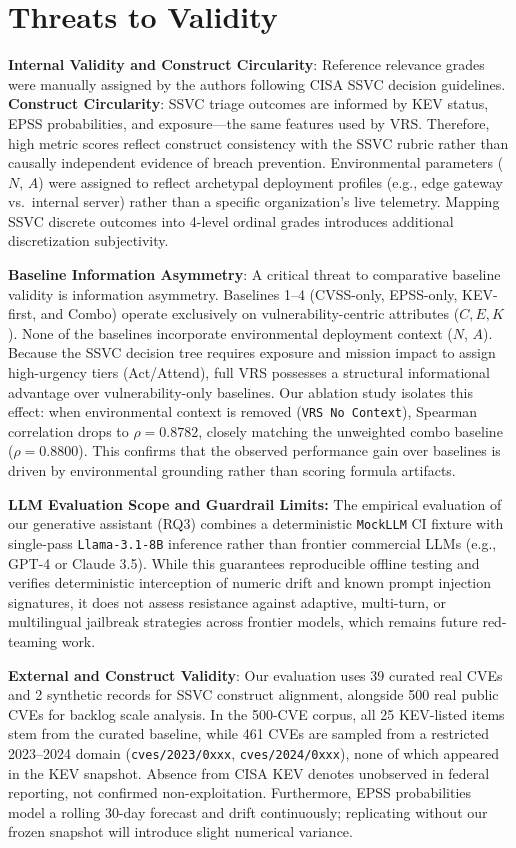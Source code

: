\documentclass[conference]{IEEEtran}
\begin{document}
\section{Threats to Validity}

\textbf{Internal Validity and Construct Circularity}:
Reference relevance grades were manually assigned by the authors following CISA SSVC decision guidelines. \textbf{Construct Circularity}: SSVC triage outcomes are informed by KEV status, EPSS probabilities, and exposure—the same features used by VRS. Therefore, high metric scores reflect construct consistency with the SSVC rubric rather than causally independent evidence of breach prevention. Environmental parameters ($N$, $A$) were assigned to reflect archetypal deployment profiles (e.g., edge gateway vs.\ internal server) rather than a specific organization's live telemetry. Mapping SSVC discrete outcomes into 4-level ordinal grades introduces additional discretization subjectivity.

\textbf{Baseline Information Asymmetry}:
A critical threat to comparative baseline validity is information asymmetry. Baselines 1--4 (CVSS-only, EPSS-only, KEV-first, and Combo) operate exclusively on vulnerability-centric attributes ($C, E, K$). None of the baselines incorporate environmental deployment context ($N$, $A$). Because the SSVC decision tree requires exposure and mission impact to assign high-urgency tiers (Act/Attend), full VRS possesses a structural informational advantage over vulnerability-only baselines. Our ablation study isolates this effect: when environmental context is removed (\texttt{VRS No Context}), Spearman correlation drops to $\rho = 0.8782$, closely matching the unweighted combo baseline ($\rho = 0.8800$). This confirms that the observed performance gain over baselines is driven by environmental grounding rather than scoring formula artifacts.

\textbf{LLM Evaluation Scope and Guardrail Limits:} The empirical evaluation of our generative assistant (RQ3) combines a deterministic \texttt{MockLLM} CI fixture with single-pass \texttt{Llama-3.1-8B} inference rather than frontier commercial LLMs (e.g., GPT-4 or Claude 3.5). While this guarantees reproducible offline testing and verifies deterministic interception of numeric drift and known prompt injection signatures, it does not assess resistance against adaptive, multi-turn, or multilingual jailbreak strategies across frontier models, which remains future red-teaming work.

\textbf{External and Construct Validity}:
Our evaluation uses 39 curated real CVEs and 2 synthetic records for SSVC construct alignment, alongside 500 real public CVEs for backlog scale analysis. In the 500-CVE corpus, all 25 KEV-listed items stem from the curated baseline, while 461 CVEs are sampled from a restricted 2023--2024 domain (\texttt{cves/2023/0xxx}, \texttt{cves/2024/0xxx}), none of which appeared in the KEV snapshot. Absence from CISA KEV denotes unobserved in federal reporting, not confirmed non-exploitation. Furthermore, EPSS probabilities model a rolling 30-day forecast and drift continuously; replicating without our frozen snapshot will introduce slight numerical variance.
\end{document}
